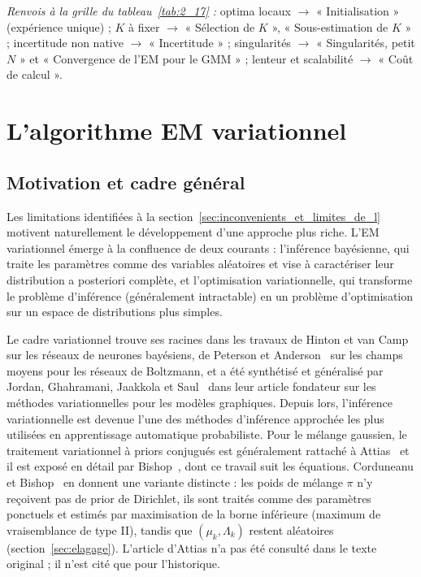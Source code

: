 \par\noindent\emph{Renvois à la grille du tableau~\ref{tab:2_17} :} optima locaux $\to$ « Initialisation » (expérience unique) ; $K$ à fixer $\to$ « Sélection de $K$ », « Sous-estimation de $K$ » ; incertitude non native $\to$ « Incertitude » ; singularités $\to$ « Singularités, petit $N$ » et « Convergence de l'EM pour le GMM » ; lenteur et scalabilité $\to$ « Coût de calcul ».
\section{L'algorithme EM variationnel}\label{sec:em_variationnel}
\subsection{Motivation et cadre général}\label{sec:motivation_et_cadre_general}
Les limitations identifiées à la section~\ref{sec:inconvenients_et_limites_de_l} motivent naturellement le développement d'une approche plus riche. L'EM variationnel émerge à la confluence de deux courants : l'inférence bayésienne, qui traite les paramètres comme des variables aléatoires et vise à caractériser leur distribution a posteriori complète, et l'optimisation variationnelle, qui transforme le problème d'inférence (généralement intractable) en un problème d'optimisation sur un espace de distributions plus simples.

Le cadre variationnel trouve ses racines dans les travaux de Hinton et van Camp~\cite{hinton1993} sur les réseaux de neurones bayésiens, de Peterson et Anderson~\cite{peterson1987} sur les champs moyens pour les réseaux de Boltzmann, et a été synthétisé et généralisé par Jordan, Ghahramani, Jaakkola et Saul~\cite{jordan1999} dans leur article fondateur sur les méthodes variationnelles pour les modèles graphiques. Depuis lors, l'inférence variationnelle est devenue l'une des méthodes d'inférence approchée les plus utilisées en apprentissage automatique probabiliste. Pour le mélange gaussien, le traitement variationnel à priors conjugués est généralement rattaché à Attias~\cite{attias2000} et il est exposé en détail par Bishop~\cite[section~10.2]{bishop2006}, dont ce travail suit les équations. Corduneanu et Bishop~\cite{corduneanu2001} en donnent une variante distincte : les poids de mélange $\pi$ n'y reçoivent pas de prior de Dirichlet, ils sont traités comme des paramètres ponctuels et estimés par maximisation de la borne inférieure (maximum de vraisemblance de type II), tandis que $(\mu_k, \Lambda_k)$ restent aléatoires (section~\ref{sec:elagage}). L'article d'Attias n'a pas été consulté dans le texte original ; il n'est cité que pour l'historique.


